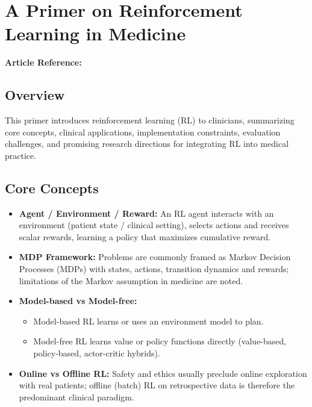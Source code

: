 \section{A Primer on Reinforcement Learning in Medicine}
\textbf{Article Reference:} \cite{PrimerReinforcementLearning}

\subsection*{Overview}
This primer introduces reinforcement learning (RL) to clinicians, summarizing core concepts, clinical applications, implementation constraints, evaluation challenges, and promising research directions for integrating RL into medical practice.

\subsection*{Core Concepts}
\begin{itemize}
    \item \textbf{Agent / Environment / Reward:} An RL agent interacts with an environment (patient state / clinical setting), selects actions and receives scalar rewards, learning a policy that maximizes cumulative reward.
    \item \textbf{MDP Framework:} Problems are commonly framed as Markov Decision Processes (MDPs) with states, actions, transition dynamics and rewards; limitations of the Markov assumption in medicine are noted.
    \item \textbf{Model-based vs Model-free:}
    \begin{itemize}
        \item Model-based RL learns or uses an environment model to plan.
        \item Model-free RL learns value or policy functions directly (value-based, policy-based, actor-critic hybrids).
    \end{itemize}
    \item \textbf{Online vs Offline RL:} Safety and ethics usually preclude online exploration with real patients; offline (batch) RL on retrospective data is therefore the predominant clinical paradigm.
\end{itemize}

